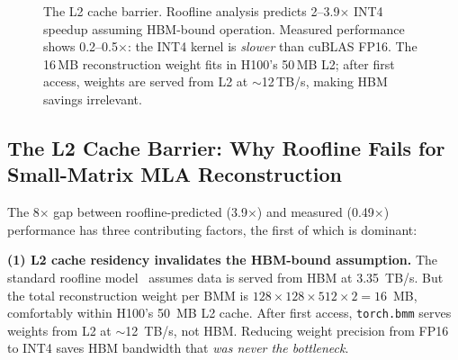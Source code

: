 \documentclass[10pt,twocolumn]{article}
\begin{document}
\begin{figure}[t]
\centering
{}
\caption{The L2 cache barrier.  Roofline analysis predicts 2--3.9$\times$ INT4 speedup assuming HBM-bound operation.  Measured performance shows 0.2--0.5$\times$: the INT4 kernel is \emph{slower} than cuBLAS FP16.  The 16\,MB reconstruction weight fits in H100's 50\,MB L2; after first access, weights are served from L2 at ${\sim}$12\,TB/s, making HBM savings irrelevant.}
\label{fig:l2barrier}
\end{figure}

\subsection{The L2 Cache Barrier: Why Roofline Fails for Small-Matrix MLA Reconstruction}
\label{sec:l2barrier}

The 8$\times$ gap between roofline-predicted (3.9$\times$) and measured (0.49$\times$) performance has three contributing factors, the first of which is dominant:

\textbf{(1) L2 cache residency invalidates the HBM-bound assumption.}  The standard roofline model~\cite{roofline} assumes data is served from HBM at 3.35~TB/s.  But the total reconstruction weight per BMM is $128 \times 128 \times 512 \times 2 = 16$~MB, comfortably within H100's 50~MB L2 cache.  After first access, \texttt{torch.bmm} serves weights from L2 at $\sim$12~TB/s, not HBM.  Reducing weight precision from FP16 to INT4 saves HBM bandwidth that \emph{was never the bottleneck}.
\end{document}
